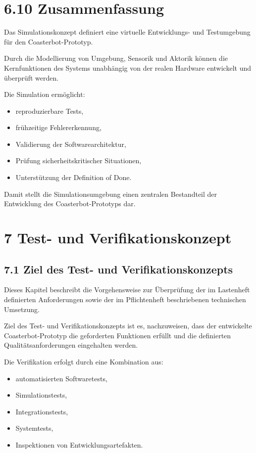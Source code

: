\documentclass[
]{article}
\providecommand{\tightlist}{%
  \setlength{\itemsep}{0pt}\setlength{\parskip}{0pt}}
\begin{document}
\section{6.10 Zusammenfassung}\label{zusammenfassung-4}

Das Simulationskonzept definiert eine virtuelle Entwicklungs- und
Testumgebung für den Coasterbot-Prototyp.

Durch die Modellierung von Umgebung, Sensorik und Aktorik können die
Kernfunktionen des Systems unabhängig von der realen Hardware entwickelt
und überprüft werden.

Die Simulation ermöglicht:

\begin{itemize}
\tightlist
\item
  reproduzierbare Tests,
\item
  frühzeitige Fehlererkennung,
\item
  Validierung der Softwarearchitektur,
\item
  Prüfung sicherheitskritischer Situationen,
\item
  Unterstützung der Definition of Done.
\end{itemize}

Damit stellt die Simulationsumgebung einen zentralen Bestandteil der
Entwicklung des Coasterbot-Prototyps dar.

\section{7 Test- und
Verifikationskonzept}\label{test--und-verifikationskonzept}

\subsection{7.1 Ziel des Test- und
Verifikationskonzepts}\label{ziel-des-test--und-verifikationskonzepts}

Dieses Kapitel beschreibt die Vorgehensweise zur Überprüfung der im
Lastenheft definierten Anforderungen sowie der im Pflichtenheft
beschriebenen technischen Umsetzung.

Ziel des Test- und Verifikationskonzepts ist es, nachzuweisen, dass der
entwickelte Coasterbot-Prototyp die geforderten Funktionen erfüllt und
die definierten Qualitätsanforderungen eingehalten werden.

Die Verifikation erfolgt durch eine Kombination aus:

\begin{itemize}
\tightlist
\item
  automatisierten Softwaretests,
\item
  Simulationstests,
\item
  Integrationstests,
\item
  Systemtests,
\item
  Inspektionen von Entwicklungsartefakten.
\end{itemize}
\end{document}
